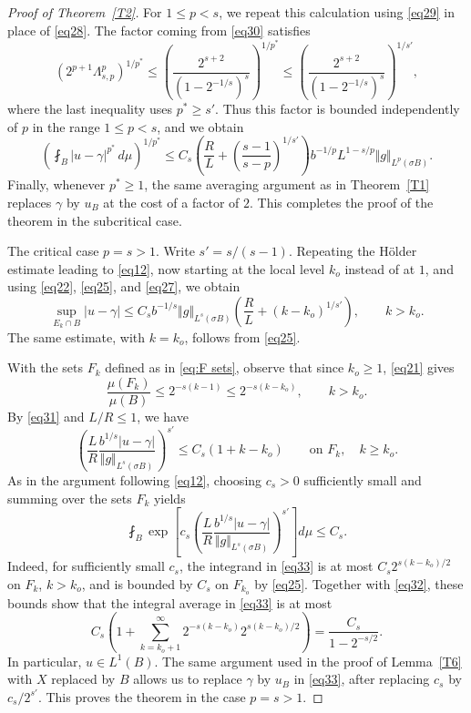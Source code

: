 \documentclass[12pt,leqno]{amsart}
\theoremstyle{definition}
\numberwithin{theorem}{section} \numberwithin{equation}{section}
\begin{document}
\begin{proof}[Proof of Theorem~\ref{T2}]
For $1\leq p<s$, we repeat this calculation using
\eqref{eq29} in place of \eqref{eq28}.
The factor coming from \eqref{eq30} satisfies
\[
 \left(2^{p+1}\Lambda_{s,p}^p\right)^{1/p^*}
 \leq
 \left(\frac{2^{s+2}}{(1-2^{-1/s})^s}\right)^{1/p^*}
 \leq
 \left(\frac{2^{s+2}}{(1-2^{-1/s})^s}\right)^{1/s'},
\]
where the last inequality uses $p^*\geq s'$.
Thus this factor is bounded independently of $p$ in the
range $1\leq p<s$, and we obtain
\[
 \left(\fint_B|u-\gamma|^{p^*}\,d\mu\right)^{1/p^*}
 \leq C_s\left(
 \frac RL+\left(\frac{s-1}{s-p}\right)^{1/s'}
 \right)b^{-1/p}L^{1-s/p}
 \Vert g\Vert_{L^p(\sigma B)}.
\]
Finally, whenever $p^*\geq1$, the same averaging argument
as in Theorem~\ref{T1} replaces $\gamma$ by $u_B$ at the
cost of a factor of $2$. This completes the proof of the theorem
in the subcritical case.


\medskip
\noindent
{\sc The critical case $p=s>1$.}
Write $s'=s/(s-1)$. Repeating the H\"older estimate leading to
\eqref{eq12}, now starting at the local level $k_o$ instead of
at $1$, and using \eqref{eq22}, \eqref{eq25}, and \eqref{eq27},
we obtain
\begin{equation}
\label{eq31}
 \sup_{E_k\cap B}|u-\gamma|
 \leq C_sb^{-1/s}\Vert g\Vert_{L^s(\sigma B)}
 \left(\frac RL+(k-k_o)^{1/s'}\right),
 \qquad k>k_o.
\end{equation}
The same estimate, with $k=k_o$, follows from \eqref{eq25}.

With the sets $F_k$ defined as in \eqref{eq:F sets}, observe that
since $k_o\geq1$, \eqref{eq21} gives
\begin{equation}
\label{eq32}
 \frac{\mu(F_k)}{\mu(B)}
 \leq2^{-s(k-1)}
 \leq2^{-s(k-k_o)},
 \qquad k>k_o.
\end{equation}
By \eqref{eq31} and $L/R\leq1$, we have
\[
 \left(
 \frac LR\frac{b^{1/s}|u-\gamma|}
 {\Vert g\Vert_{L^s(\sigma B)}}
 \right)^{s'}
 \leq C_s(1+k-k_o)
 \qquad\text{on }F_k,\quad k\geq k_o.
\]
As in the argument following \eqref{eq12}, choosing $c_s>0$
sufficiently small and summing over the sets $F_k$ yields
%
\begin{equation}
\label{eq33}
 \fint_B
 \exp\!\left[
 c_s\left(
 \frac LR\frac{b^{1/s}|u-\gamma|}
 {\Vert g\Vert_{L^s(\sigma B)}}
 \right)^{s'}
 \right]d\mu
 \leq C_s.
\end{equation}
Indeed, for sufficiently small $c_s$, the integrand in
\eqref{eq33} is at most $C_s2^{s(k-k_o)/2}$ on $F_k$,
$k>k_o$, and is bounded by $C_s$ on $F_{k_o}$ by
\eqref{eq25}. Together with \eqref{eq32}, these bounds
show that the integral average in \eqref{eq33} is at most
\[
 C_s\left(
 1+\sum_{k=k_o+1}^{\infty}
 2^{-s(k-k_o)}2^{s(k-k_o)/2}
 \right)
 =\frac{C_s}{1-2^{-s/2}}.
\]
In particular, $u\in L^1(B)$. The same argument used in the proof of Lemma~\ref{T6} with $X$ replaced by $B$ allows us to replace $\gamma$ by $u_B$ in \eqref{eq33}, after replacing
$c_s$ by $c_s/2^{s'}$. This proves the theorem in the case
$p=s>1$.



\end{proof}
\end{document}

